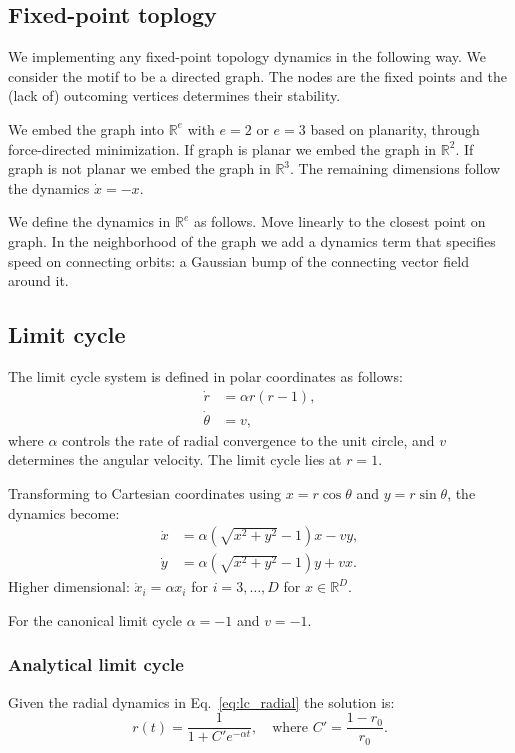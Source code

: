 \documentclass{article}
\theoremstyle{definition} \newtheorem{definition}{Definition}  \newtheorem{example}{Example}
\theoremstyle{remark} \newtheorem{remark}{Remark}
\newcounter{ct}
\newcommand{\field}[1]{\ensuremath{\mathbb{#1}}}
\newcommand{\reals}{\field{R}}
\begin{document}
\subsection{Fixed-point toplogy}\label{sec:fpt}
We implementing any fixed-point topology dynamics in the following way.
We consider the motif to be a directed graph. %
The nodes are the fixed points and the (lack of) outcoming vertices determines their stability.

We embed the graph into $\reals^e$ with $e=2$ or $e=3$ based on planarity, through force-directed minimization.
If graph is planar we embed the graph in $\reals^2$.
If graph is not planar we embed the graph in  $\reals^3$.
The remaining dimensions follow the dynamics $\dot x = - x$. %

We define the dynamics in $\reals^e$ as follows.
Move linearly to the closest point on graph.
In the neighborhood of the graph we add a dynamics term that specifies speed on connecting orbits: a Gaussian bump of the connecting vector field around it.


\subsection{Limit cycle}\label{sec:lc}
The limit cycle system is defined in polar coordinates as follows:
\begin{align}%
\dot{r} &= \alpha r(r - 1), \label{eq:lc_radial} \\
\dot{\theta} &= v, \label{eq:lc_angular} %
\end{align}
where \( \alpha \) controls the rate of radial convergence to the unit circle, and \( v \) determines the angular velocity.
The limit cycle lies at \( r = 1 \).

Transforming to Cartesian coordinates using \( x = r \cos\theta \) and \( y = r \sin\theta \), the dynamics become:
\[
\begin{aligned}
\dot{x} &= \alpha \left( \sqrt{x^2 + y^2} - 1 \right) x - v y, \\
\dot{y} &= \alpha \left( \sqrt{x^2 + y^2} - 1 \right) y + v x.
\end{aligned}
\]
Higher dimensional: $\dot x_i = \alpha x_i$ for $i=3, \dots, D$ for $x\in \reals^D$.

For the canonical limit cycle  $\alpha=-1$ and $v=-1$.

%
\subsubsection{Analytical limit cycle}\label{sec:analytical_lc}
Given the radial dynamics in Eq.~\ref{eq:lc_radial} the solution is:
\[
r(t) = \frac{1}{1 + C' e^{-\alpha t}}, \quad \text{where } C' = \frac{1 - r_0}{r_0}.
\]
\end{document}
